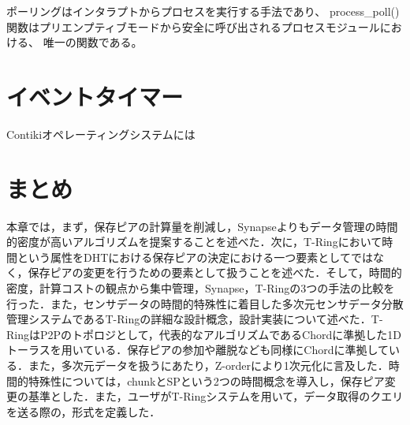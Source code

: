 ポーリングはインタラプトからプロセスを実行する手法であり、
process\_poll()関数はプリエンプティブモードから安全に呼び出されるプロセスモジュールにおける、
唯一の関数である。


\section{イベントタイマー}
Contikiオペレーティングシステムには



\section{まとめ}
本章では，まず，保存ピアの計算量を削減し，Synapseよりもデータ管理の時間的密度が高いアルゴリズムを提案することを述べた．次に，T-Ringにおいて時間という属性をDHTにおける保存ピアの決定における一つ要素としてではなく，保存ピアの変更を行うための要素として扱うことを述べた．そして，時間的密度，計算コストの観点から集中管理，Synapse，T-Ringの3つの手法の比較を行った．また，センサデータの時間的特殊性に着目した多次元センサデータ分散管理システムであるT-Ringの詳細な設計概念，設計実装について述べた．T-RingはP2Pのトポロジとして，代表的なアルゴリズムであるChordに準拠した1Dトーラスを用いている．保存ピアの参加や離脱なども同様にChordに準拠している．また，多次元データを扱うにあたり，Z-orderにより1次元化に言及した．時間的特殊性については，chunkとSPという2つの時間概念を導入し，保存ピア変更の基準とした．また，ユーザがT-Ringシステムを用いて，データ取得のクエリを送る際の，形式を定義した．




